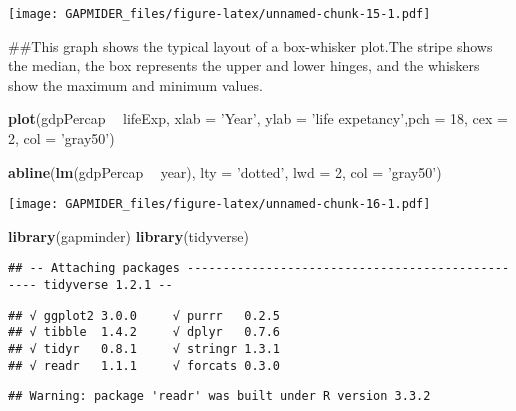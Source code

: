 \documentclass[]{article}
\newenvironment{Shaded}{\begin{snugshade}}{\end{snugshade}}
\newcommand{\DataTypeTok}[1]{\textcolor[rgb]{0.13,0.29,0.53}{#1}}
\newcommand{\DecValTok}[1]{\textcolor[rgb]{0.00,0.00,0.81}{#1}}
\newcommand{\KeywordTok}[1]{\textcolor[rgb]{0.13,0.29,0.53}{\textbf{#1}}}
\newcommand{\NormalTok}[1]{#1}
\newcommand{\OperatorTok}[1]{\textcolor[rgb]{0.81,0.36,0.00}{\textbf{#1}}}
\newcommand{\StringTok}[1]{\textcolor[rgb]{0.31,0.60,0.02}{#1}}
\begin{document}
\texttt{[image: GAPMIDER\_files/figure-latex/unnamed-chunk-15-1.pdf]}

\begin{Shaded}
\begin{Highlighting}[]
\NormalTok{##This graph shows the typical layout of a box-whisker plot.The stripe shows the median, the box represents the upper and lower hinges, and the whiskers show the maximum and minimum values.}
\end{Highlighting}
\end{Shaded}

\begin{Shaded}
\begin{Highlighting}[]
\KeywordTok{plot}\NormalTok{(gdpPercap }\OperatorTok{~}\StringTok{ }\NormalTok{lifeExp, }\DataTypeTok{xlab =} \StringTok{'Year'}\NormalTok{, }\DataTypeTok{ylab =} \StringTok{'life expetancy'}\NormalTok{,}\DataTypeTok{pch =} \DecValTok{18}\NormalTok{, }\DataTypeTok{cex =} \DecValTok{2}\NormalTok{, }\DataTypeTok{col =} \StringTok{'gray50'}\NormalTok{)}
 
\KeywordTok{abline}\NormalTok{(}\KeywordTok{lm}\NormalTok{(gdpPercap }\OperatorTok{~}\StringTok{ }\NormalTok{year), }\DataTypeTok{lty =} \StringTok{'dotted'}\NormalTok{, }\DataTypeTok{lwd =} \DecValTok{2}\NormalTok{, }\DataTypeTok{col =} \StringTok{'gray50'}\NormalTok{)}
\end{Highlighting}
\end{Shaded}

\texttt{[image: GAPMIDER\_files/figure-latex/unnamed-chunk-16-1.pdf]}

\begin{Shaded}
\begin{Highlighting}[]
\KeywordTok{library}\NormalTok{(gapminder)}
\KeywordTok{library}\NormalTok{(tidyverse)}
\end{Highlighting}
\end{Shaded}

\begin{verbatim}
## -- Attaching packages ------------------------------------------------- tidyverse 1.2.1 --
\end{verbatim}

\begin{verbatim}
## √ ggplot2 3.0.0     √ purrr   0.2.5
## √ tibble  1.4.2     √ dplyr   0.7.6
## √ tidyr   0.8.1     √ stringr 1.3.1
## √ readr   1.1.1     √ forcats 0.3.0
\end{verbatim}

\begin{verbatim}
## Warning: package 'readr' was built under R version 3.3.2
\end{verbatim}
\end{document}

